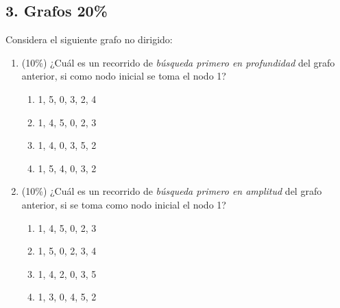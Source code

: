 \documentclass[10 pt]{article}
\begin{document}
\begin{multicols}{2}
\section{3. Grafos  20\%}
Considera el siguiente grafo no dirigido:
\begin{center}
	\end{center}
	\begin{enumerate}[label=\alph*)]
		\item (10\%) ¿Cuál es un recorrido de \emph{búsqueda primero en profundidad} del grafo anterior, si como nodo inicial se toma el nodo 1?
		\begin{enumerate}[label=\roman*)]
			\item 1, 5, 0, 3, 2, 4
			\item 1, 4, 5, 0, 2, 3
			\item 1, 4, 0, 3, 5, 2
			\item 1, 5, 4, 0, 3, 2
		\end{enumerate}
	    \item (10\%) ¿Cuál es un recorrido de \emph{búsqueda primero en amplitud} del grafo anterior, si se toma como nodo inicial el nodo 1?
	    \begin{enumerate}[label=\roman*)]
	    	\item 1, 4, 5, 0, 2, 3
	    	\item 1, 5, 0, 2, 3, 4
	    	\item 1, 4, 2, 0, 3, 5
	    	\item 1, 3, 0, 4, 5, 2
	    \end{enumerate}
	\end{enumerate}


\end{multicols}
\end{document}
